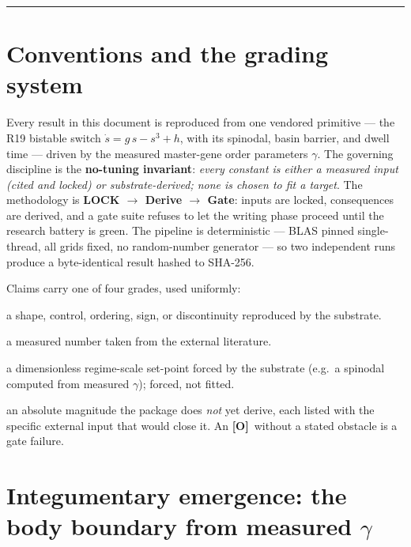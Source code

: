 \documentclass[11pt,a4paper]{article}
\newcommand{\V}{\textcolor{gV}{\textbf{[V]}}}
\newcommand{\Lg}{\textcolor{gL}{\textbf{[L]}}}
\newcommand{\Fg}{\textcolor{gF}{\textbf{[F]}}}
\newcommand{\Og}{\textcolor{gO}{\textbf{[O]}}}
\begin{document}
\tableofcontents
\vspace{1em}
\hrule
\vspace{0.6em}

\section*{Conventions and the grading system}

Every result in this document is reproduced from one vendored primitive --- the R19 bistable switch
$\dot s = g\,s - s^{3} + h$, with its spinodal, basin barrier, and dwell time --- driven by the measured
master-gene order parameters $\gamma$. The governing discipline is the \textbf{no-tuning invariant}:
\emph{every constant is either a measured input (cited and locked) or substrate-derived; none is chosen to fit a
target}. The methodology is \textbf{LOCK $\to$ Derive $\to$ Gate}: inputs are locked, consequences are derived, and a
gate suite refuses to let the writing phase proceed until the research battery is green. The pipeline is
deterministic --- BLAS pinned single-thread, all grids fixed, no random-number generator --- so two independent runs
produce a byte-identical result hashed to SHA-256.

Claims carry one of four grades, used uniformly:

\begin{description}[leftmargin=2.6em,style=nextline,itemsep=1pt]
\item[\V\ Simulation-verified] a shape, control, ordering, sign, or discontinuity reproduced by the substrate.
\item[\Lg\ Cited anchor] a measured number taken from the external literature.
\item[\Fg\ Forced (substrate)] a dimensionless regime-scale set-point forced by the substrate (e.g.\ a spinodal
      computed from measured $\gamma$); forced, not fitted.
\item[\Og\ Open (obstacle stated)] an absolute magnitude the package does \emph{not} yet derive, each listed with
      the specific external input that would close it. An \Og\ without a stated obstacle is a gate failure.
\end{description}

\section{Integumentary emergence: the body boundary from measured $\gamma$}
\end{document}
